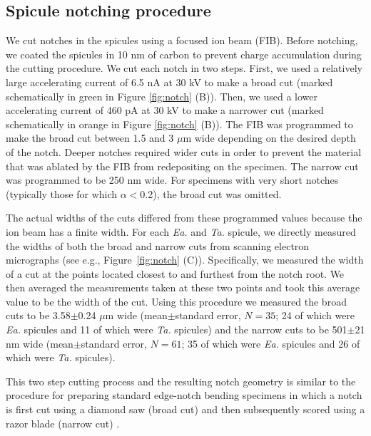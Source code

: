 \documentclass[12pt,onecolumn]{article}
\makeatletter
\newcommand{\TA}{\textit{Ta.\@}\xspace}
\newcommand{\EA}{\textit{Ea.\@}\xspace}
\makeatother
\begin{document}
\subsection*{Spicule notching procedure}
\label{sec:notchconfig}
We cut notches in the spicules using a focused ion beam (FIB). Before notching, we coated the spicules in 10 nm of carbon to prevent charge accumulation during the cutting procedure. We cut each notch in two steps. First, we used a relatively large accelerating current of 6.5 nA at 30 kV to make a broad cut (marked schematically in green in Figure \ref{fig:notch} (B)). Then, we used a lower accelerating current of 460 pA at 30 kV to make a narrower cut (marked schematically in orange in Figure \ref{fig:notch} (B)). The FIB was programmed to make the broad cut between 1.5 and 3 $\mu$m wide depending on the desired depth of the notch. Deeper notches required wider cuts in order to prevent the material that was ablated by the FIB from redepositing on the specimen. The narrow cut was programmed to be 250 nm wide. For specimens with very short notches (typically those for which $\alpha<$0.2), the broad cut was omitted.

The actual widths of the cuts differed from these programmed values because the ion beam has a finite width. For each \EA and \TA spicule, we directly measured the widths of both the broad and narrow cuts from scanning electron micrographs (see e.g., Figure~\ref{fig:notch} (C)). Specifically, we measured the width of a cut at the points located closest to and furthest from the notch root. We then averaged the measurements taken at these two points and took this average value to be the width of the cut. Using this procedure we measured the broad cuts to be 3.58$\pm$0.24 $\mu$m wide (mean$\pm$standard error, $N=35$; 24 of which were \EA spicules and 11 of which were \TA spicules) and the narrow cuts to be 501$\pm$21 nm wide (mean$\pm$standard error, $N=61$; 35 of which were \EA spicules and 26 of which were \TA spicules).

This two step cutting process and the resulting notch geometry is similar to the procedure for preparing standard edge-notch bending specimens in which a notch is first cut using a diamond saw (broad cut) and then subsequently scored using a razor blade (narrow cut) \cite{rocha2006effect,kubler1997fracture,damani1996critical}.
\end{document}
